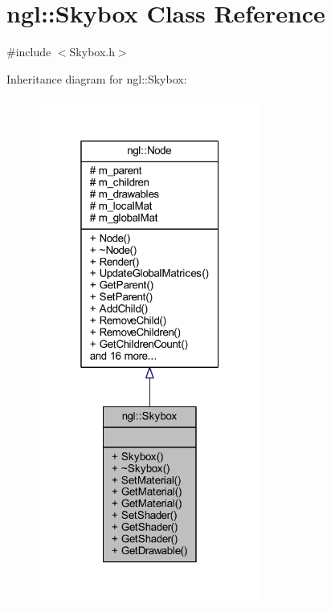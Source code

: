 \hypertarget{classngl_1_1_skybox}{}\section{ngl\+:\+:Skybox Class Reference}
\label{classngl_1_1_skybox}


{\ttfamily \#include $<$Skybox.\+h$>$}



Inheritance diagram for ngl\+:\+:Skybox\+:
\nopagebreak
\begin{figure}[H]
\begin{center}
\leavevmode
\includegraphics[width=208pt]{classngl_1_1_skybox__inherit__graph}
\end{center}
\end{figure}


